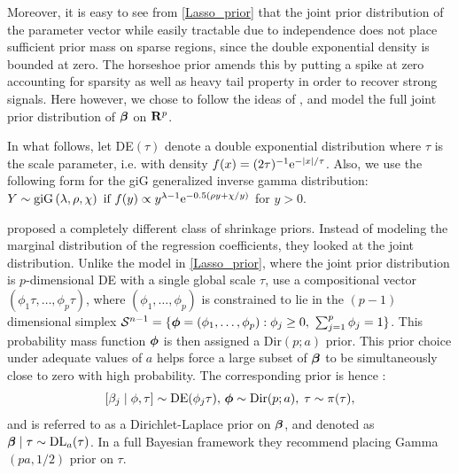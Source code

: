 \documentclass[10pt]{article}
\begin{document}
Moreover, it is easy to see from \eqref{Lasso_prior} that the joint prior distribution of the parameter vector while easily tractable due to independence does not place sufficient prior mass on sparse regions, since the double exponential density is bounded at zero. The horseshoe prior amends this by putting a spike at zero accounting for sparsity as well as heavy tail property in order to recover strong signals. Here however, we chose to follow the ideas of \citep{bhattacharya2014dirichlet}, and model the full joint prior distribution of $\boldsymbol{\beta}$ on ${\bf R}^p$.

In what follows, let \rm{DE}$(\tau )$ denote a double exponential distribution where $\tau$ is the scale parameter, \rm{i.e.}  with density $f(x) = (2\tau)^{-1} {\rm e}^{-\lvert x\rvert/ \tau }$. Also, we use the following form for the \rm{giG} generalized inverse gamma distribution: $Y\sim\text{\rm{giG}} \left(\lambda,\rho , \chi \right) \text{ if } f(y) \propto y^{\lambda - 1} {\rm e}^{-0.5 \left( \rho y + \chi /y \right) }  $ for $y > 0$.

\cite{bhattacharya2014dirichlet} proposed a completely different class of shrinkage priors. Instead of modeling the marginal distribution of the regression coefficients, they looked at the joint distribution. Unlike the model in \eqref{Lasso_prior}, where the joint prior distribution is $p$-dimensional \rm{DE} with a single global scale $\tau$, \cite{bhattacharya2014dirichlet} use a compositional vector $\left(\phi_1 \tau , \ldots , \phi_p \tau \right)$, where $ \left( \phi_1 , \ldots , \phi_p \right) $ is constrained to lie in the $ (p - 1) $ dimensional simplex $\mathcal{S}^{n-1} = \{ \boldsymbol{\phi} = (\phi_1 , \ldots , \phi_p ) : \phi_j \geq 0, \ \sum_{j = 1}^{p} \phi_j = 1 \}$. This probability mass function $\boldsymbol{\phi}$ is then assigned a \rm{Dir}$(p; a)$ prior. This prior choice under adequate values of $a$ helps force a large subset of $\boldsymbol{\beta}$ to be simultaneously close to zero with high probability. The corresponding prior is hence :\[ [\beta_j \mid \phi , \tau] \sim \text{\rm{DE}}(\phi_j \tau), \, \boldsymbol{\phi} \sim \text{\rm{Dir}}(p;a), \; \tau \sim \pi(\tau),\] and is referred to as a Dirichlet-Laplace prior on $\boldsymbol{\beta}$, and denoted as $\boldsymbol{\beta} \mid \tau \sim \text{\rm{DL}}_a(\tau)$. In a full Bayesian framework they recommend placing \rm{Gamma}$(pa ,1/2)$ prior on $\tau$. 
\end{document}
